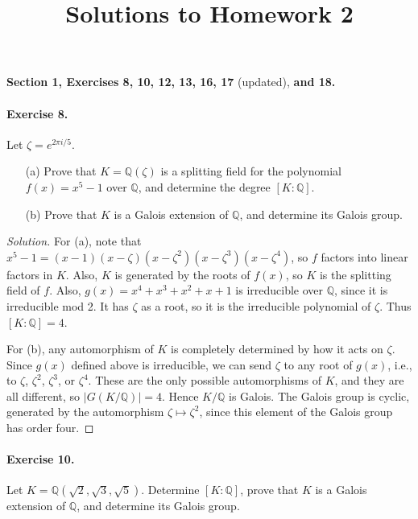 \documentclass{article}
\title{Solutions to Homework 2}
\date{}
\newcommand{\Q}{\mathbb Q}
\newcommand{\Gal}{G}
\begin{document}
\maketitle
{\noindent\bf Section 1, Exercises 8, 10, 12, 13, 16, 17} (updated),
{\bf and 18.}

\paragraph{Exercise 8.} Let $\zeta=e^{2\pi i/5}.$
\begin{itemize}
\item[(a)] Prove that $K=\Q(\zeta)$ is a splitting field for the polynomial $f(x)=x^5-1$ over $\Q$, and determine the degree $[K:\Q]$.
\item[(b)] Prove that $K$ is a Galois extension of $\Q$, and determine its Galois group.
\end{itemize}

\begin{proof}[Solution]
For (a), note that $x^5-1=(x-1)(x-\zeta)(x-\zeta^2)(x-\zeta^3)(x-\zeta^4)$, so $f$ factors into linear factors in $K$. Also, $K$ is generated by the roots of $f(x)$, so $K$ is the splitting field of $f$.
Also, $g(x)=x^4+x^3+x^2+x+1$ is irreducible over $\Q$, since it is irreducible mod 2. It has $\zeta$ as a root, so it is the irreducible polynomial of $\zeta$. Thus $[K:\Q]=4$.

For (b), any automorphism of $K$ is completely determined by how it acts on $\zeta$. Since $g(x)$ defined above is irreducible, we can send $\zeta$ to any root of $g(x)$, i.e., to $\zeta$, $\zeta^2$, $\zeta^3$, or $\zeta^4$. These are the only possible automorphisms of $K$, and they are all different, so $|\Gal(K/\Q)|=4$. Hence $K/\Q$ is Galois. The Galois group is cyclic, generated by the automorphism $\zeta \mapsto \zeta^2$, since this element of the Galois group has order four.
\end{proof}

\paragraph{Exercise 10.} Let $K=\Q(\sqrt 2,\sqrt 3,\sqrt 5)$. Determine $[K:\Q]$, prove that $K$ is a Galois extension of $\Q$, and determine its Galois group.
\end{document}
